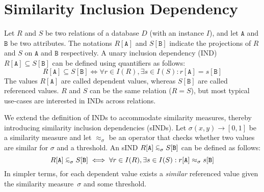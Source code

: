 \section{Similarity Inclusion Dependency}
\label{section:background}


Let $R$ and $S$ be two relations of a database $D$ (with an instance $I$), and let $\mathtt{A}$ and $\mathtt{B}$ be two attributes.
The notations $R[\mathtt{A}]$ and $S[\mathtt{B}]$ indicate the projections of $R$ and $S$ on $\mathtt{A}$ and $\mathtt{B}$ respectively.
A unary inclusion dependency (IND) $R[\mathtt{A}] \subseteq S[\mathtt{B}]$ can be defined using quantifiers as follows:
\begin{equation*}
    R[\mathtt{A}] \subseteq S[\mathtt{B}] \iff \forall r \in I(R), \exists s \in I(S): r[\mathtt{A}] = s[\mathtt{B}]
\end{equation*}
The values $R[\mathtt{A}]$ are called dependent values, whereas $S[\mathtt{B}]$ are called referenced values. $R$ and $S$ can be the same relation ($R=S$), but most typical use-cases are interested in INDs across relations.

We extend the definition of INDs to accommodate similarity measures, thereby introducing similarity inclusion dependencies (sINDs).
Let $\sigma(x,y) \rightarrow [0,1]$ be a similarity measure and let $\approx_\sigma$ be an operator that checks whether two values are similar for $\sigma$ and a threshold.
An sIND $R[\mathtt{A}] \simIND{\sigma} S[\mathtt{B}]$ can be defined as follows:
\begin{equation*}
    R[\mathtt{A}] \simIND{\sigma} S[\mathtt{B}] \iff \forall r \in I(R), \exists s \in I(S): r[\mathtt{A}] \approx_\sigma s[\mathtt{B}]
\end{equation*}
In simpler terms, for each dependent value exists a \emph{similar} referenced value given the similarity measure~$\sigma$ and some threshold.

